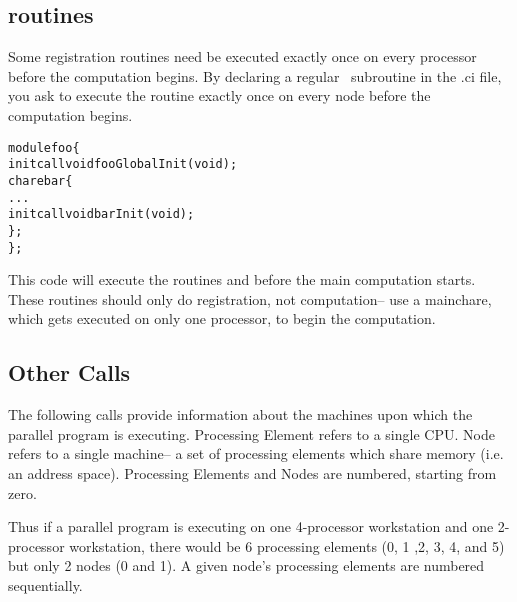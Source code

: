 \subsection{ routines}
\experimental{}
Some registration routines need be executed exactly once
on every processor before the computation begins.
By declaring a regular \CC\ subroutine 
 in the .ci file, you ask \charmpp to execute 
the routine exactly once on every node before the
computation begins.

\begin{alltt}
module foo \{
    initcall void fooGlobalInit(void);
    chare bar \{
        ...
        initcall void barInit(void);
    \};
\};
\end{alltt}

This code will execute the routines  and
 before the main computation starts.
These routines should only do registration, not computation--
use a mainchare, which gets executed on only one processor,
to begin the computation.

\subsection{Other Calls}

\label{other Charm++ calls}

The following calls provide information about the machines upon which the
parallel program is executing.  Processing Element refers to a single CPU.
Node refers to a single machine-- a set of processing elements which share
memory (i.e. an address space).  Processing Elements and Nodes are numbered,
starting from zero.

Thus if a parallel program is executing on one 4-processor workstation and one
2-processor workstation, there would be 6 processing elements (0, 1 ,2, 3, 4,
and 5) but only 2 nodes (0 and 1).  A given node's processing elements are
numbered sequentially.

 

 

 

 

